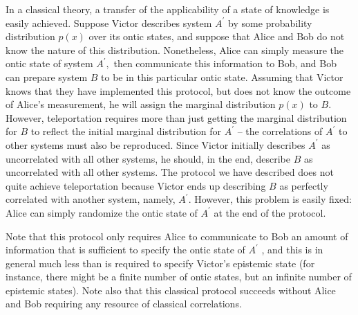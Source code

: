 \documentclass[pra,twocolumn,nofootinbib,showpacs]{revtex4}
\begin{document}
In a classical theory, a transfer of the applicability of a state of
knowledge is easily achieved. Suppose Victor describes system $A^{\prime }$
by some probability distribution $p(x)$ over its ontic states, and suppose
that Alice and Bob do not know the nature of this distribution. Nonetheless,
Alice can simply measure the ontic state of system $A^{\prime },$ then
communicate this information to Bob, and Bob can prepare system $B$ to be in
this particular ontic state. Assuming that Victor knows that they have
implemented this protocol, but does not know the outcome of Alice's
measurement, he will assign the marginal distribution $p(x)$ to $B.$
However, teleportation requires more than just getting the marginal
distribution for $B$ to reflect the initial marginal distribution for $%
A^{\prime }$ -- the correlations of $A^{\prime }$ to other systems must also
be reproduced. Since Victor initially describes $A^{\prime }$ as
uncorrelated with all other systems, he should, in the end, describe $B$ as
uncorrelated with all other systems. The protocol we have described does not
quite achieve teleportation because Victor ends up describing $B$ as
perfectly correlated with another system, namely, $A^{\prime }$. However,
this problem is easily fixed: Alice can simply randomize the ontic state of $%
A^{\prime }$ at the end of the protocol.

Note that this protocol only requires Alice to communicate to Bob an amount
of information that is sufficient to specify the ontic state of $A^{\prime }$%
, and this is in general much less than is required to specify Victor's
epistemic state (for instance, there might be a finite number of ontic
states, but an infinite number of epistemic states). Note also that this
classical protocol succeeds without Alice and Bob requiring any resource of
classical correlations.
\end{document}
